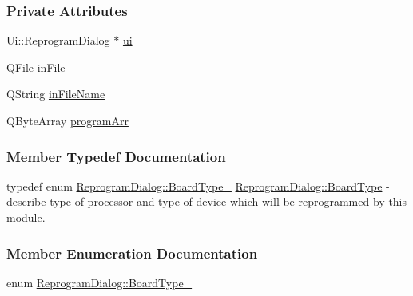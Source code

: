\subsubsection*{Private Attributes}
\begin{DoxyCompactItemize}
\item 
Ui\+::\+Reprogram\+Dialog $\ast$ \mbox{\hyperlink{classReprogramDialog_a0adb9c63d59d13d77203e334ec321b49}{ui}}
\item 
Q\+File \mbox{\hyperlink{classReprogramDialog_aeb56932944b2f861acffa0ab72a5a54f}{in\+File}}
\item 
Q\+String \mbox{\hyperlink{classReprogramDialog_ae56bcc760f9b1b305dc80756e7592ad7}{in\+File\+Name}}
\item 
Q\+Byte\+Array \mbox{\hyperlink{classReprogramDialog_ae9a10d87b7aa4dea0b6068ad6c336913}{program\+Arr}}
\end{DoxyCompactItemize}


\subsubsection{Member Typedef Documentation}
\mbox{\label{classReprogramDialog_a95e0c039a5de1ea8d3ad44a6ccf17b6a}} 
{\footnotesize\ttfamily typedef enum \mbox{\hyperlink{classReprogramDialog_a068bfc2d12863d24912b9ead24679b4a}{Reprogram\+Dialog\+::\+Board\+Type\+\_\+}} \mbox{\hyperlink{classReprogramDialog_a95e0c039a5de1ea8d3ad44a6ccf17b6a}{Reprogram\+Dialog\+::\texorpdfstring{Board\+Type}{BoardType}}}} - describe type of processor and type of device which will be reprogrammed by this module.


\subsubsection{Member Enumeration Documentation}
\mbox{\label{classReprogramDialog_a068bfc2d12863d24912b9ead24679b4a}} 
{\footnotesize\ttfamily enum \mbox{\hyperlink{classReprogramDialog_a068bfc2d12863d24912b9ead24679b4a}{Reprogram\+Dialog\+::\texorpdfstring{Board\+Type\+\_\+}{BoardType\_}}}}

